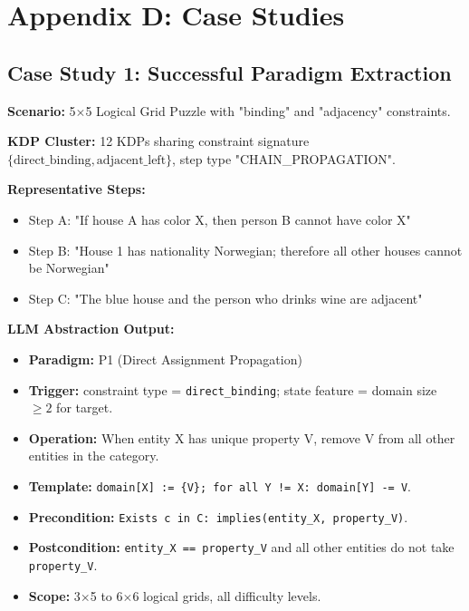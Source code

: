 
\section{Appendix D: Case Studies}

\subsection{Case Study 1: Successful Paradigm Extraction}

\textbf{Scenario:} 5$\times$5 Logical Grid Puzzle with "binding" and "adjacency" constraints.

\textbf{KDP Cluster:} 12 KDPs sharing constraint signature $\{\text{direct\_binding}, \text{adjacent\_left}\}$, step type "CHAIN\_PROPAGATION".

\textbf{Representative Steps:}
\begin{itemize}
    \item Step A: "If house A has color X, then person B cannot have color X"
    \item Step B: "House 1 has nationality Norwegian; therefore all other houses cannot be Norwegian"
    \item Step C: "The blue house and the person who drinks wine are adjacent"
\end{itemize}

\textbf{LLM Abstraction Output:}
\begin{itemize}
    \item \textbf{Paradigm:} P1 (Direct Assignment Propagation)
    \item \textbf{Trigger:} constraint type = \texttt{direct\_binding}; state feature = domain size $\geq 2$ for target.
    \item \textbf{Operation:} When entity X has unique property V, remove V from all other entities in the category.
    \item \textbf{Template:} \texttt{domain[X] := \{V\}; for all Y != X: domain[Y] -= V}.
    \item \textbf{Precondition:} \texttt{Exists c in C: implies(entity\_X, property\_V)}.
    \item \textbf{Postcondition:} \texttt{entity\_X == property\_V} and all other entities do not take \texttt{property\_V}.
    \item \textbf{Scope:} 3$\times$5 to 6$\times$6 logical grids, all difficulty levels.
\end{itemize}

